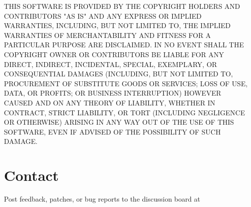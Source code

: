 \documentclass[11pt,titlepage]{article}
\begin{document}
THIS SOFTWARE IS PROVIDED BY THE COPYRIGHT HOLDERS AND CONTRIBUTORS "AS IS" AND ANY EXPRESS OR IMPLIED WARRANTIES, INCLUDING, BUT NOT LIMITED TO, THE IMPLIED WARRANTIES OF MERCHANTABILITY AND FITNESS FOR A PARTICULAR PURPOSE ARE DISCLAIMED. IN NO EVENT SHALL THE COPYRIGHT OWNER OR CONTRIBUTORS BE LIABLE FOR ANY DIRECT, INDIRECT, INCIDENTAL, SPECIAL, EXEMPLARY, OR CONSEQUENTIAL DAMAGES (INCLUDING, BUT NOT LIMITED TO, PROCUREMENT OF SUBSTITUTE GOODS OR SERVICES; LOSS OF USE, DATA, OR PROFITS; OR BUSINESS INTERRUPTION) HOWEVER CAUSED AND ON ANY THEORY OF LIABILITY, WHETHER IN CONTRACT, STRICT LIABILITY, OR TORT (INCLUDING NEGLIGENCE OR OTHERWISE) ARISING IN ANY WAY OUT OF THE USE OF THIS SOFTWARE, EVEN IF ADVISED OF THE POSSIBILITY OF SUCH DAMAGE.

\section{Contact}

Post feedback, patches, or bug reports to the discussion board at \\
\end{document}
